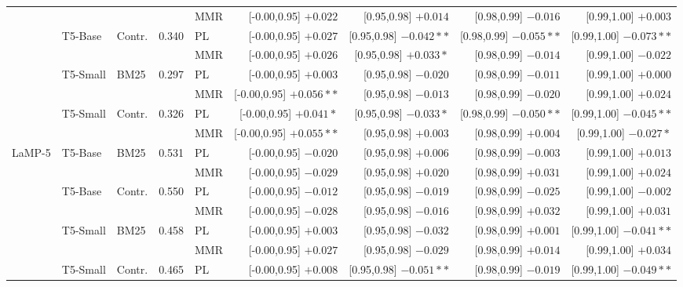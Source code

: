 \documentclass[10pt]{article}
\begin{document}
\begin{table}[p]
\begin{tabular}{@{}lllrlrrrr@{}}
 &  &  &  & MMR & [-0.00,0.95] $+0.022$ & [0.95,0.98] $+0.014$ & [0.98,0.99] $-0.016$ & [0.99,1.00] $+0.003$ \\
\cmidrule(lr){1-9}
 & \multirow{2}{*}{T5-Base} & \multirow{2}{*}{Contr.} & \multirow{2}{*}{0.340} & PL & [-0.00,0.95] $+0.027$ & [0.95,0.98] $-0.042**$ & [0.98,0.99] $-0.055**$ & [0.99,1.00] $-0.073**$ \\
 &  &  &  & MMR & [-0.00,0.95] $+0.026$ & [0.95,0.98] $+0.033*$ & [0.98,0.99] $-0.014$ & [0.99,1.00] $-0.022$ \\
\cmidrule(lr){1-9}
 & \multirow{2}{*}{T5-Small} & \multirow{2}{*}{BM25} & \multirow{2}{*}{0.297} & PL & [-0.00,0.95] $+0.003$ & [0.95,0.98] $-0.020$ & [0.98,0.99] $-0.011$ & [0.99,1.00] $+0.000$ \\
 &  &  &  & MMR & [-0.00,0.95] $+0.056**$ & [0.95,0.98] $-0.013$ & [0.98,0.99] $-0.020$ & [0.99,1.00] $+0.024$ \\
\cmidrule(lr){1-9}
 & \multirow{2}{*}{T5-Small} & \multirow{2}{*}{Contr.} & \multirow{2}{*}{0.326} & PL & [-0.00,0.95] $+0.041*$ & [0.95,0.98] $-0.033*$ & [0.98,0.99] $-0.050**$ & [0.99,1.00] $-0.045**$ \\
 &  &  &  & MMR & [-0.00,0.95] $+0.055**$ & [0.95,0.98] $+0.003$ & [0.98,0.99] $+0.004$ & [0.99,1.00] $-0.027*$ \\
\midrule
\multirow{2}{*}{LaMP-5} & \multirow{2}{*}{T5-Base} & \multirow{2}{*}{BM25} & \multirow{2}{*}{0.531} & PL & [-0.00,0.95] $-0.020$ & [0.95,0.98] $+0.006$ & [0.98,0.99] $-0.003$ & [0.99,1.00] $+0.013$ \\
 &  &  &  & MMR & [-0.00,0.95] $-0.029$ & [0.95,0.98] $+0.020$ & [0.98,0.99] $+0.031$ & [0.99,1.00] $+0.024$ \\
\cmidrule(lr){1-9}
 & \multirow{2}{*}{T5-Base} & \multirow{2}{*}{Contr.} & \multirow{2}{*}{0.550} & PL & [-0.00,0.95] $-0.012$ & [0.95,0.98] $-0.019$ & [0.98,0.99] $-0.025$ & [0.99,1.00] $-0.002$ \\
 &  &  &  & MMR & [-0.00,0.95] $-0.028$ & [0.95,0.98] $-0.016$ & [0.98,0.99] $+0.032$ & [0.99,1.00] $+0.031$ \\
\cmidrule(lr){1-9}
 & \multirow{2}{*}{T5-Small} & \multirow{2}{*}{BM25} & \multirow{2}{*}{0.458} & PL & [-0.00,0.95] $+0.003$ & [0.95,0.98] $-0.032$ & [0.98,0.99] $+0.001$ & [0.99,1.00] $-0.041**$ \\
 &  &  &  & MMR & [-0.00,0.95] $+0.027$ & [0.95,0.98] $-0.029$ & [0.98,0.99] $+0.014$ & [0.99,1.00] $+0.034$ \\
\cmidrule(lr){1-9}
 & \multirow{2}{*}{T5-Small} & \multirow{2}{*}{Contr.} & \multirow{2}{*}{0.465} & PL & [-0.00,0.95] $+0.008$ & [0.95,0.98] $-0.051**$ & [0.98,0.99] $-0.019$ & [0.99,1.00] $-0.049**$ \\

\end{tabular}
\end{table}
\end{document}

